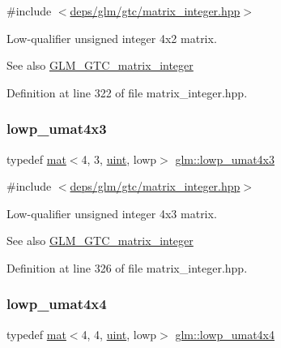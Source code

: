 {\ttfamily \#include $<$\hyperlink{matrix__integer_8hpp}{deps/glm/gtc/matrix\+\_\+integer.\+hpp}$>$}

Low-\/qualifier unsigned integer 4x2 matrix. \begin{DoxySeeAlso}{See also}
\hyperlink{group__gtc__matrix__integer}{G\+L\+M\+\_\+\+G\+T\+C\+\_\+matrix\+\_\+integer} 
\end{DoxySeeAlso}


Definition at line 322 of file matrix\+\_\+integer.\+hpp.

\mbox{\label{group__gtc__matrix__integer_ga5eb6bfe468dd615e0a78fb9f3ca813c6}} 
\subsubsection{\texorpdfstring{lowp\+\_\+umat4x3}{lowp\_umat4x3}}
{\footnotesize\ttfamily typedef \hyperlink{structglm_1_1mat}{mat}$<$4, 3, \hyperlink{group__core__precision_ga4fd29415871152bfb5abd588334147c8}{uint}, lowp$>$ \hyperlink{group__gtc__matrix__integer_ga5eb6bfe468dd615e0a78fb9f3ca813c6}{glm\+::lowp\+\_\+umat4x3}}



{\ttfamily \#include $<$\hyperlink{matrix__integer_8hpp}{deps/glm/gtc/matrix\+\_\+integer.\+hpp}$>$}

Low-\/qualifier unsigned integer 4x3 matrix. \begin{DoxySeeAlso}{See also}
\hyperlink{group__gtc__matrix__integer}{G\+L\+M\+\_\+\+G\+T\+C\+\_\+matrix\+\_\+integer} 
\end{DoxySeeAlso}


Definition at line 326 of file matrix\+\_\+integer.\+hpp.

\mbox{\label{group__gtc__matrix__integer_ga4386ea62144a0c737b4789ed87df4177}} 
\subsubsection{\texorpdfstring{lowp\+\_\+umat4x4}{lowp\_umat4x4}}
{\footnotesize\ttfamily typedef \hyperlink{structglm_1_1mat}{mat}$<$4, 4, \hyperlink{group__core__precision_ga4fd29415871152bfb5abd588334147c8}{uint}, lowp$>$ \hyperlink{group__gtc__matrix__integer_ga4386ea62144a0c737b4789ed87df4177}{glm\+::lowp\+\_\+umat4x4}}



